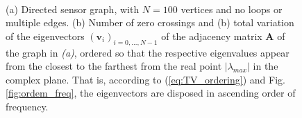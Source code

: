 \begin{figure}
	\centering
    \caption{(a) Directed sensor graph, with $ N=100 $ vertices and no loops or multiple edges. (b) Number of zero crossings and (b) total variation of the eigenvectors $ (\mathbf{v}_i)_{i=0,\dots,N-1} $ of the adjacency matrix $ \mathbf{A} $ of the graph in \emph{(a)}, ordered so that the respective eigenvalues appear from the closest to the farthest from the real point $ |\lambda_{max}| $ in the complex plane. That is, according to (\ref{eq:TV_ordering}) and Fig. \ref{fig:ordem_freq}, the eigenvectors are disposed in ascending order of frequency.}
	~
	\floatsource
	\label{fig:showing_random_sensor_spectrum_directed}
\end{figure}

